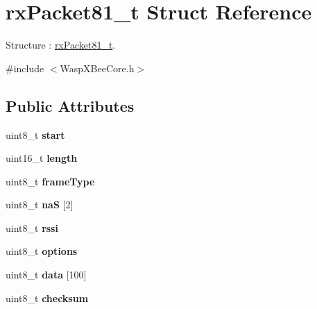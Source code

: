 \hypertarget{structrx_packet81__t}{}\section{rx\+Packet81\+\_\+t Struct Reference}
\label{structrx_packet81__t}


Structure \+: \hyperlink{structrx_packet81__t}{rx\+Packet81\+\_\+t}.  




{\ttfamily \#include $<$Wasp\+X\+Bee\+Core.\+h$>$}

\subsection*{Public Attributes}
\begin{DoxyCompactItemize}
\item 
uint8\+\_\+t {\bfseries start}\hypertarget{structrx_packet81__t_ad8fa440ea51dce503b03efb8f30fec95}{}\label{structrx_packet81__t_ad8fa440ea51dce503b03efb8f30fec95}

\item 
uint16\+\_\+t {\bfseries length}\hypertarget{structrx_packet81__t_a29890f0d2101d6c012dad7acbe22c7b4}{}\label{structrx_packet81__t_a29890f0d2101d6c012dad7acbe22c7b4}

\item 
uint8\+\_\+t {\bfseries frame\+Type}\hypertarget{structrx_packet81__t_aae32babf0554906e788c83e66da1b97e}{}\label{structrx_packet81__t_aae32babf0554906e788c83e66da1b97e}

\item 
uint8\+\_\+t {\bfseries naS} \mbox{[}2\mbox{]}\hypertarget{structrx_packet81__t_a55bea30d9b4be09652faf9302184d385}{}\label{structrx_packet81__t_a55bea30d9b4be09652faf9302184d385}

\item 
uint8\+\_\+t {\bfseries rssi}\hypertarget{structrx_packet81__t_a9d54a8cdd3af955ed8c0ebe9ef4e9c61}{}\label{structrx_packet81__t_a9d54a8cdd3af955ed8c0ebe9ef4e9c61}

\item 
uint8\+\_\+t {\bfseries options}\hypertarget{structrx_packet81__t_a7126384e3f45b7364c017d26ced2f8ef}{}\label{structrx_packet81__t_a7126384e3f45b7364c017d26ced2f8ef}

\item 
uint8\+\_\+t {\bfseries data} \mbox{[}100\mbox{]}\hypertarget{structrx_packet81__t_ac0cb1150121cfd123708daab636fa3f6}{}\label{structrx_packet81__t_ac0cb1150121cfd123708daab636fa3f6}

\item 
uint8\+\_\+t {\bfseries checksum}\hypertarget{structrx_packet81__t_a181e226381818478a4a0544982f78732}{}\label{structrx_packet81__t_a181e226381818478a4a0544982f78732}

\end{DoxyCompactItemize}


